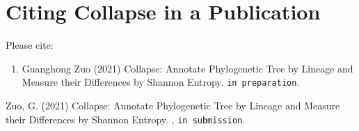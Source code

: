 \documentclass[12pt,a4paper]{article}
\begin{document}
\section{Citing Collapse in a Publication}
Please cite:
\begin{enumerate}\itemsep 0pt
	\item Guanghong Zuo (2021) Collapse: Annotate Phylogenetic Tree by Lineage and Measure their Differences by Shannon Entropy. {\tt in preparation}.
\end{enumerate}

\begin{thebibliography}{}
	Zuo, G. (2021) Collapse: Annotate Phylogenetic Tree by Lineage and Measure their Differences by Shannon Entropy. , {\tt in submission}.
\end{thebibliography}
\end{document}
